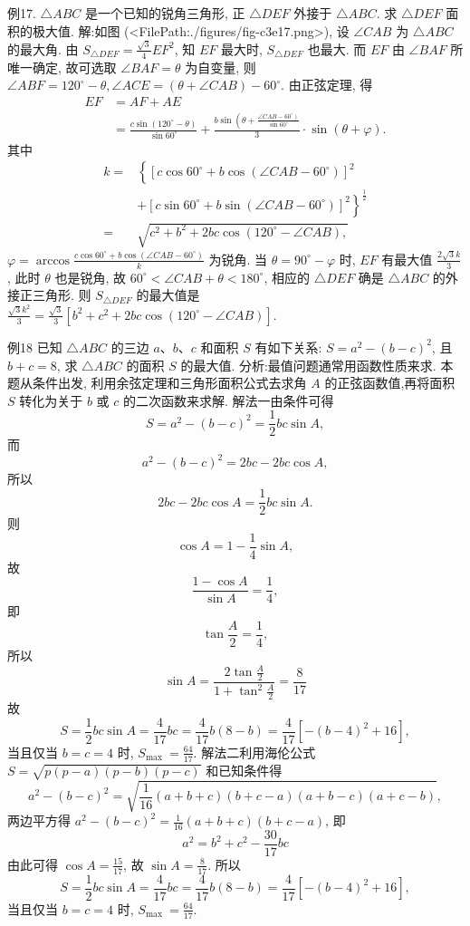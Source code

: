例17. $\triangle A B C$ 是一个已知的锐角三角形, 正 $\triangle D E F$ 外接于 $\triangle A B C$. 求 $\triangle D E F$ 面积的极大值.
解:如图 (<FilePath:./figures/fig-c3e17.png>), 设 $\angle C A B$ 为 $\triangle A B C$ 的最大角.
由 $S_{\triangle D E F}=\frac{\sqrt{3}}{4} E F^2$, 知 $E F$ 最大时, $S_{\triangle D E F}$ 也最大.
而 $E F$ 由 $\angle B A F$ 所唯一确定, 故可选取 $\angle B A F=\theta$ 为自变量, 则 $\angle A B F=120^{\circ}-\theta, \angle A C E=(\theta+\angle C A B)-60^{\circ}$. 由正弦定理, 得
$$
\begin{aligned}
E F & =A F+A E \\
& =\frac{c \sin \left(120^{\circ}-\theta\right)}{\sin 60^{\circ}}+\frac{b \sin \left(\theta+\frac{\left.\angle C A B-60^{\circ}\right)}{\sin 60^{\circ}}\right.}{3} \cdot \sin (\theta+\varphi) .
\end{aligned}
$$
其中
$$
\begin{aligned}
k= & \left\{\left[c \cos 60^{\circ}+b \cos \left(\angle C A B-60^{\circ}\right)\right]^2\right. \\
& \left.+\left[c \sin 60^{\circ}+b \sin \left(\angle C A B-60^{\circ}\right)\right]^2\right\}^{\frac{1}{2}} \\
= & \sqrt{c^2+b^2+2 b c \cos \left(120^{\circ}-\angle C A B\right),}
\end{aligned}
$$
$\varphi=\arccos \frac{c \cos 60^{\circ}+b \cos \left(\angle C A B-60^{\circ}\right)}{k}$ 为锐角.
当 $\theta=90^{\circ}-\varphi$ 时, $E F$ 有最大值 $\frac{2 \sqrt{3} k}{3}$, 此时 $\theta$ 也是锐角, 故 $60^{\circ}< \angle C A B+\theta<180^{\circ}$, 相应的 $\triangle D E F$ 确是 $\triangle A B C$ 的外接正三角形.
则 $S_{\triangle D E F}$ 的最大值是 $\frac{\sqrt{3} k^2}{3}=\frac{\sqrt{3}}{3}\left[b^2+c^2+2 b c \cos \left(120^{\circ}-\angle C A B\right)\right]$.



例18 已知 $\triangle A B C$ 的三边 $a 、 b 、 c$ 和面积 $S$ 有如下关系: $S=a^2-(b- c)^2$, 且 $b+c=8$, 求 $\triangle A B C$ 的面积 $S$ 的最大值.
分析:最值问题通常用函数性质来求.
本题从条件出发, 利用余弦定理和三角形面积公式去求角 $A$ 的正弦函数值,再将面积 $S$ 转化为关于 $b$ 或 $c$ 的二次函数来求解.
解法一由条件可得
$$
S=a^2-(b-c)^2=\frac{1}{2} b c \sin A,
$$
而
$$
a^2-(b-c)^2=2 b c-2 b c \cos A,
$$
所以
$$
2 b c-2 b c \cos A=\frac{1}{2} b c \sin A .
$$
则
$$
\cos A=1-\frac{1}{4} \sin A,
$$
故
$$
\frac{1-\cos A}{\sin A}=\frac{1}{4},
$$
即
$$
\tan \frac{A}{2}=\frac{1}{4},
$$
所以
$$
\sin A=\frac{2 \tan \frac{A}{2}}{1+\tan ^2 \frac{A}{2}}=\frac{8}{17}
$$
故
$$
S=\frac{1}{2} b c \sin A=\frac{4}{17} b c=\frac{4}{17} b(8-b)=\frac{4}{17}\left[-(b-4)^2+16\right],
$$
当且仅当 $b=c=4$ 时, $S_{\text {max }}=\frac{64}{17}$.
解法二利用海伦公式 $S=\sqrt{p(p-a)(p-b)(p-c)}$ 和已知条件得
$$
a^2-(b-c)^2=\sqrt{\frac{1}{16}(a+b+c)(b+c-a)(a+b-c)(a+c-b)},
$$
两边平方得 $a^2-(b-c)^2=\frac{1}{16}(a+b+c)(b+c-a)$, 即
$$
a^2=b^2+c^2-\frac{30}{17} b c
$$
由此可得 $\cos A=\frac{15}{17}$, 故 $\sin A=\frac{8}{17}$.
所以
$$
S=\frac{1}{2} b c \sin A=\frac{4}{17} b c=\frac{4}{17} b(8-b)=\frac{4}{17}\left[-(b-4)^2+16\right],
$$
当且仅当 $b=c=4$ 时, $S_{\text {max }}=\frac{64}{17}$.



